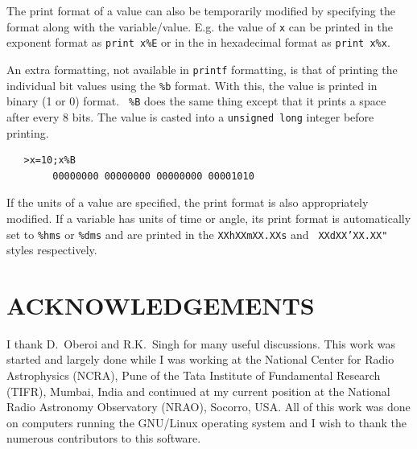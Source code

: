 \documentclass[12pt]{article}
\begin{document}
The print format of a value can also be temporarily modified by
specifying the format along with the variable/value.  E.g. the value
of {\tt x} can be printed in the exponent format as {\tt print x\%E}
or in the in hexadecimal format as {\tt print x\%x}.

An extra formatting, not available in {\tt printf} formatting, is that
of printing the individual bit values using the {\tt \%b} format.
With this, the value is printed in binary (1 or 0) format.  {\tt
\%B} does the same thing except that it prints a space after every 8 bits.
The value is casted into a {\tt unsigned long} integer before
printing.
\begin{verbatim}
   >x=10;x%B
        00000000 00000000 00000000 00001010
\end{verbatim}
If the units of a value are specified, the print format is also
appropriately modified.  If a variable has units of time or angle, its
print format is automatically set to {\tt \%hms} or {\tt \%dms}
and are printed in the {\tt XXhXXmXX.XXs} and {\tt
XXdXX{\texttt{'}}XX.XX{\texttt{"}}} styles respectively.


\section*{ACKNOWLEDGEMENTS}
I thank D.~Oberoi and R.K.~Singh for many useful discussions.  This
work was started and largely done while I was working at the National
Center for Radio Astrophysics (NCRA), Pune of the Tata Institute of
Fundamental Research (TIFR), Mumbai, India and continued at my current
position at the National Radio Astronomy Observatory (NRAO), Socorro,
USA.  All of this work was done on computers running the GNU/Linux
operating system and I wish to thank the numerous contributors to this
software.

%




\end{document}
